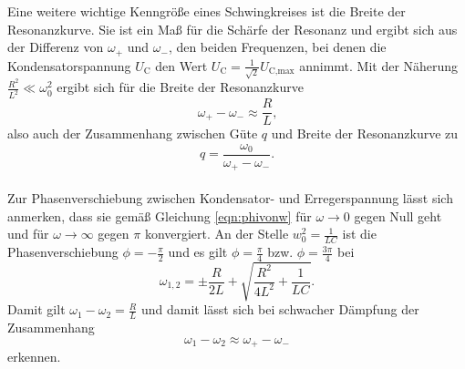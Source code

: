Eine weitere wichtige Kenngröße eines Schwingkreises ist die Breite der Resonanzkurve.
Sie ist ein Maß für die Schärfe der Resonanz und ergibt sich aus der Differenz von
$\omega_+$ und $\omega_-$, den beiden Frequenzen, bei denen die Kondensatorspannung $U_{\text{C}}$ den Wert $U_{\text{C}} = \frac{1}{\sqrt{2}} U_{\text{C,max}}$ annimmt.
Mit der Näherung $\frac{R^2}{L^2} \ll \omega_0^2$ ergibt sich für die Breite der Resonanzkurve
\begin{equation}
	\label{eqn:breite}
	\omega_+ - \omega_- \approx \frac{R}{L} \text{,}
\end{equation}
also auch der Zusammenhang zwischen Güte $q$ und Breite der Resonanzkurve zu
\begin{equation}
	q = \frac{\omega_0}{\omega_+ - \omega_-} \text{.}
\end{equation}
\\
Zur Phasenverschiebung zwischen Kondensator- und Erregerspannung lässt sich anmerken,
dass sie gemäß Gleichung \eqref{eqn:phivonw} für $\omega \to 0$ gegen Null geht und für
$\omega \to \infty$ gegen $\pi$ konvergiert.
An der Stelle $w_0^2 = \frac{1}{LC}$ ist die Phasenverschiebung $\phi = -\frac{\pi}{2}$ und es gilt $\phi = \frac{\pi}{4}$ bzw. $\phi = \frac{3\pi}{4}$ bei
\begin{equation}
	\label{eqn:omega12}
	\omega_{1,2} = \pm \frac{R}{2L} + \sqrt{\frac{R^2}{4L^2} + \frac{1}{LC}} \text{.}
\end{equation}
Damit gilt $\omega_1 - \omega_2 = \frac{R}{L}$ und damit lässt sich bei schwacher Dämpfung
der Zusammenhang
\begin{equation}
	\omega_1 - \omega_2 \approx \omega_+ - \omega_-
\end{equation}
erkennen.
